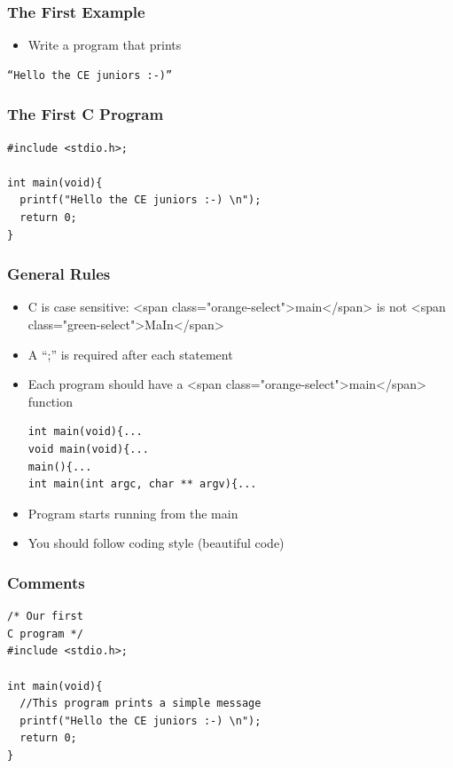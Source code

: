 \documentclass{../c-lecture}
\begin{document}
\begin{frame}[fragile]
  \frametitle{The First Example}
  \begin{itemize}
    \item Write a program that prints
  \end{itemize}
  \begin{verbatim}
“Hello the CE juniors :-)”
  \end{verbatim}
\end{frame}

\begin{frame}[fragile]
  \frametitle{The First C Program}
  \begin{verbatim}
#include <stdio.h>;

int main(void){
  printf("Hello the CE juniors :-) \n");
  return 0;
}
  \end{verbatim}
\end{frame}

\begin{frame}[fragile]
  \frametitle{General Rules}
  \begin{itemize}
    \item
      C is case sensitive: <span class="orange-select">main</span> is not
      <span class="green-select">MaIn</span>

    \item A “;” is required after each statement
    \item
      Each program should have a
      <span class="orange-select">main</span> function

    \begin{verbatim}
int main(void){...
void main(void){...
main(){...
int main(int argc, char ** argv){...
    \end{verbatim}

    \item Program starts running from the main
    \item You should follow coding style (beautiful code)
  \end{itemize}
\end{frame}

\begin{frame}[fragile]
  \frametitle{Comments}
    \begin{verbatim}
/* Our first
C program */
#include <stdio.h>;

int main(void){
  //This program prints a simple message
  printf("Hello the CE juniors :-) \n");
  return 0;
}
  \end{verbatim}
\end{frame}
\end{document}
